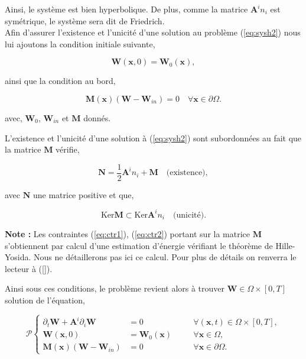 \documentclass[a4paper,oneside,10pt]{report}
\begin{document}
Ainsi, le système est bien hyperbolique. De plus, comme la matrice $\mathbf{A}^in_i $ est symétrique, le système sera dit de Friedrich.\\

Afin d'assurer l'existence et l'unicité d'une solution au problème (\ref{eq:sysh2}) nous lui ajoutons la condition initiale suivante,

\begin{equation}
\label{eq:ini} 
\mathbf{W}(\mathbf{x},0)=\mathbf{W}_0(\mathbf{x}),
\end{equation}

ainsi que la condition au bord,

\begin{equation}
\label{eq:bound} 
\mathbf{M}(\mathbf{x})(\mathbf{W}-\mathbf{W}_{in})=0\quad\forall \mathbf{x} \in \partial \Omega.
\end{equation}

avec, $\mathbf{W}_0$, $\mathbf{W}_{in}$ et $\mathbf{M}$ donnés.\newline

L'existence et l'unicité d'une solution à (\ref{eq:sysh2}) sont subordonnées au fait que la matrice $\mathbf{M}$ vérifie,

\begin{equation}
\label{eq:ctr1}
\mathbf{N} = \frac{1}{2} \mathbf{A}^in_i + \mathbf{M}\quad \mbox{(existence)},
\end{equation}

avec $\mathbf{N}$ une matrice positive et que,

\begin{equation}
\label{eq:ctr2}
\mbox{Ker}\mathbf{M} \subset \mbox{Ker}\mathbf{A}^in_i \quad \mbox{(unicité)}.
\end{equation}

\textbf{Note :} Les contraintes (\ref{eq:ctr1}), (\ref{eq:ctr2}) portant sur la matrice $\mathbf{M}$ s'obtiennent par calcul d'une estimation d'énergie vérifiant le théorème de Hille-Yosida. Nous ne détaillerons pas ici ce calcul. Pour plus de détails on renverra le lecteur à (\ref{}).\\
\newline


Ainsi sous ces conditions, le problème revient alors à trouver $\mathbf{W}\in\Omega \times [0,T]$ solution de l'équation,

\begin{equation}
\label{eq:final}
\mathcal{P} \left\{
\begin{aligned}
\partial_t \mathbf{W} +  \mathbf{A}^i\partial_i \mathbf{W} &= 0 &\quad &\forall (\mathbf{x},t) \in \Omega \times [0,T],\\
\mathbf{W}(\mathbf{x},0)&=\mathbf{W}_0(\mathbf{x}) &\quad &\forall \mathbf{x} \in \Omega,\\
\mathbf{M}(\mathbf{x})(\mathbf{W}-\mathbf{W}_{in})&=0&\quad&\forall \mathbf{x} \in \partial\Omega.
\end{aligned}
\right.
\end{equation}
\end{document}
